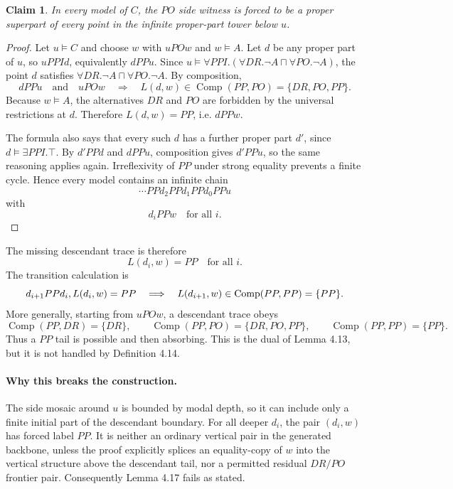 \documentclass[11pt]{article}
\newcommand{\Comp}{\operatorname{Comp}}
\newcommand{\Top}{\top}
\newtheorem*{claim}{Claim}
\begin{document}
\begin{claim}
In every model of $C$, the $PO$ side witness is forced to be a proper superpart of every point in the infinite proper-part tower below $u$.
\end{claim}

\begin{proof}
Let $u\models C$ and choose $w$ with $uPOw$ and $w\models A$. Let $d$ be any proper part of $u$, so $uPPI d$, equivalently $dPPu$. Since $u\models \forall PPI.(\forall DR.\neg A\sqcap\forall PO.\neg A)$, the point $d$ satisfies $\forall DR.\neg A\sqcap\forall PO.\neg A$. By composition,
\[
  dPPu \quad\text{and}\quad uPOw
  \quad\Longrightarrow\quad
  L(d,w)\in \Comp(PP,PO)=\{DR,PO,PP\}.
\]
Because $w\models A$, the alternatives $DR$ and $PO$ are forbidden by the universal restrictions at $d$. Therefore $L(d,w)=PP$, i.e. $dPPw$.

The formula also says that every such $d$ has a further proper part $d'$, since $d\models\exists PPI.\Top$. By $d'PPd$ and $dPPu$, composition gives $d'PPu$, so the same reasoning applies again. Irreflexivity of $PP$ under strong equality prevents a finite cycle. Hence every model contains an infinite chain
\[
  \cdots PP d_2PPd_1PPd_0PPu
\]
with
\[
  d_iPPw\quad\text{for all }i.
\]
\end{proof}

The missing descendant trace is therefore
\[
  L(d_i,w)=PP\quad\text{for all }i.
\]
The transition calculation is
\[
  d_{i+1}PPd_i,\\ L(d_i,w)=PP
  \quad\Longrightarrow\quad
  L(d_{i+1},w)\in \Comp(PP,PP)=\{PP\}.
\]
More generally, starting from $uPOw$, a descendant trace obeys
\[
\Comp(PP,DR)=\{DR\},\qquad
\Comp(PP,PO)=\{DR,PO,PP\},\qquad
\Comp(PP,PP)=\{PP\}.
\]
Thus a $PP$ tail is possible and then absorbing. This is the dual of Lemma 4.13, but it is not handled by Definition 4.14.

\paragraph{Why this breaks the construction.} The side mosaic around $u$ is bounded by modal depth, so it can include only a finite initial part of the descendant boundary. For all deeper $d_i$, the pair $(d_i,w)$ has forced label $PP$. It is neither an ordinary vertical pair in the generated backbone, unless the proof explicitly splices an equality-copy of $w$ into the vertical structure above the descendant tail, nor a permitted residual $DR/PO$ frontier pair. Consequently Lemma 4.17 fails as stated.
\end{document}
